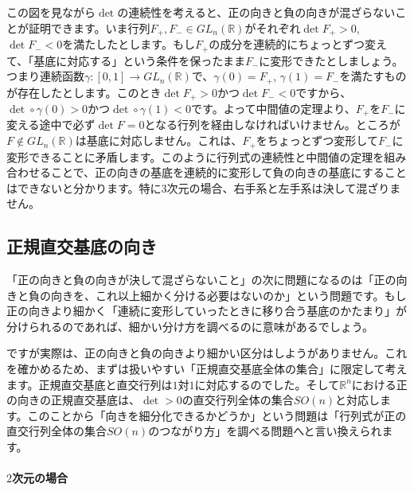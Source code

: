 この図を見ながら$\det$の連続性を考えると、正の向きと負の向きが混ざらないことが証明できます。いま行列$F_+, F_- \in GL_n(\mathbb{R})$がそれぞれ$\det F_+ > 0$, $\det F_- < 0$を満たしたとします。もし$F_+$の成分を連続的にちょっとずつ変えて、「基底に対応する」という条件を保ったまま$F_-$に変形できたとしましょう。つまり連続函数$\gamma\colon [0, 1] \rightarrow GL_n(\mathbb{R})$で、$\gamma(0) = F_+$, $\gamma(1) = F_-$を満たすものが存在したとします。このとき$\det F_+ > 0$かつ$\det F_- < 0$ですから、$\det \circ \gamma(0) > 0$かつ$\det \circ \gamma(1) < 0$です。よって中間値の定理より、$F_+$を$F_-$に変える途中で必ず$\det F = 0$となる行列を経由しなければいけません。ところが$F \not \in GL_n(\mathbb{R})$は基底に対応しません。これは、$F_+$をちょっとずつ変形して$F_-$に変形できることに矛盾します。このように行列式の連続性と中間値の定理を組み合わせることで、正の向きの基底を連続的に変形して負の向きの基底にすることはできないと分かります。特に$3$次元の場合、右手系と左手系は決して混ざりません。

\subsection{正規直交基底の向き}

「正の向きと負の向きが決して混ざらないこと」の次に問題になるのは「正の向きと負の向きを、これ以上細かく分ける必要はないのか」という問題です。もし正の向きより細かく「連続に変形していったときに移り合う基底のかたまり」が分けられるのであれば、細かい分け方を調べるのに意味があるでしょう。

ですが実際は、正の向きと負の向きより細かい区分はしようがありません。これを確かめるため、まずは扱いやすい「正規直交基底全体の集合」に限定して考えます。正規直交基底と直交行列は$1$対$1$に対応するのでした。そして$\mathbb{R}^n$における正の向きの正規直交基底は、$\det > 0$の直交行列全体の集合$SO(n)$と対応します。このことから「向きを細分化できるかどうか」という問題は「行列式が正の直交行列全体の集合$SO(n)$のつながり方」を調べる問題へと言い換えられます。

\paragraph{$2$次元の場合}

